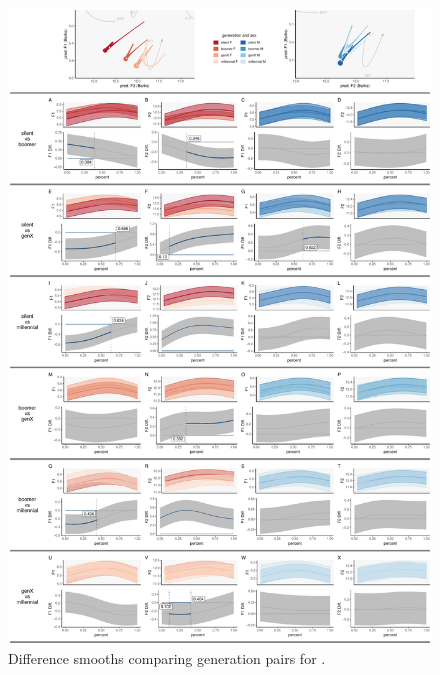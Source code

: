 \begin{figure}[p]
    \centering
    \includegraphics[width=\textwidth]{Figures/BEN/BEN_detailed_generation_panel_plot.pdf}
    \caption{Difference smooths comparing generation pairs for \ben.}
    \label{fig:ben_diff_smooths_gen}
\end{figure}

